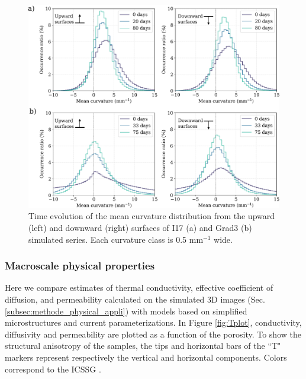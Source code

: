 \documentclass[draft,ms]{agujournal2019}
\begin{document}
\begin{figure}
    \centering
    \includegraphics[width=\linewidth]{Figures/histo_i17_grad3.pdf}
    \caption{Time evolution of the mean curvature distribution from the upward (left) and downward (right) surfaces of I17 (a) and Grad3 (b) simulated series. Each curvature class is 0.5 mm$^{-1}$ wide.}
    \label{fig:histo_i17_grad3}
\end{figure}

\subsubsection{Macroscale physical properties}

Here we compare estimates of thermal conductivity, effective coefficient of diffusion, and permeability calculated on the simulated 3D images (Sec. \ref{subsec:methode_physical_appli}) with models based on simplified microstructures and current parameterizations. In Figure \ref{fig:Tplot}, conductivity, diffusivity and permeability are plotted as a function of the porosity. To show the structural anisotropy of the samples, the tips and horizontal bars of the ``T" markers represent respectively the vertical and horizontal components. Colors correspond to the ICSSG \cite{fierz2009international}.\\
 
\end{document}
